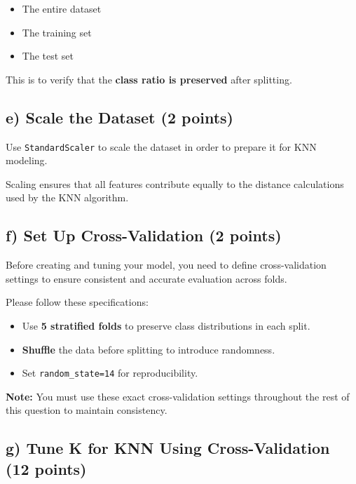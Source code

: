 \documentclass[
  letterpaper,
  DIV=11,
  numbers=noendperiod]{scrreprt}
\providecommand{\tightlist}{%
  \setlength{\itemsep}{0pt}\setlength{\parskip}{0pt}}\usepackage{longtable,booktabs,array}
\begin{document}
\begin{itemize}
\tightlist
\item
  The entire dataset\\
\item
  The training set\\
\item
  The test set
\end{itemize}

This is to verify that the \textbf{class ratio is preserved} after
splitting.

\subsection{\texorpdfstring{e) Scale the Dataset \textbf{(2
points)}}{e) Scale the Dataset (2 points)}}\label{e-scale-the-dataset-2-points}

Use \texttt{StandardScaler} to scale the dataset in order to prepare it
for KNN modeling.

Scaling ensures that all features contribute equally to the distance
calculations used by the KNN algorithm.

\subsection{\texorpdfstring{f) Set Up Cross-Validation \textbf{(2
points)}}{f) Set Up Cross-Validation (2 points)}}\label{f-set-up-cross-validation-2-points}

Before creating and tuning your model, you need to define
cross-validation settings to ensure consistent and accurate evaluation
across folds.

Please follow these specifications:

\begin{itemize}
\tightlist
\item
  Use \textbf{5 stratified folds} to preserve class distributions in
  each split.
\item
  \textbf{Shuffle} the data before splitting to introduce randomness.
\item
  Set \texttt{random\_state=14} for reproducibility.
\end{itemize}

\textbf{Note:} You must use these exact cross-validation settings
throughout the rest of this question to maintain consistency.

\subsection{\texorpdfstring{g) Tune K for KNN Using Cross-Validation
\textbf{(12
points)}}{g) Tune K for KNN Using Cross-Validation (12 points)}}\label{g-tune-k-for-knn-using-cross-validation-12-points}
\end{document}
